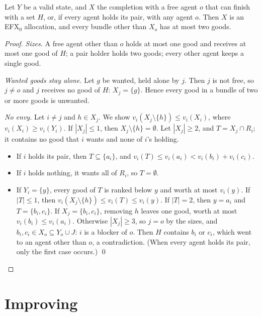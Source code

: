 \documentclass[runningheads,11pt]{llncs}
\newcommand{\efxz}{\texorpdfstring{\mbox{EFX$_0$}}{EFX0}}
\begin{document}
\begin{theorem}[soundness]\label{thm:sound}
Let $Y$ be a valid state, and $X$ the completion with a free agent $o$ that can finish with a set $H$, or, if every agent holds its pair, with any agent $o$. Then $X$ is an \efxz{} allocation, and every bundle other than $X_o$ has at most two goods.
\end{theorem}

\begin{proof}
\emph{Sizes.} A free agent other than $o$ holds at most one good and receives at most one good of $H$; a pair holder holds two goods; every other agent keeps a single good.

\emph{Wanted goods stay alone.} Let $g$ be wanted, held alone by $j$. Then $j$ is not free, so $j\ne o$ and $j$ receives no good of $H$: $X_j=\{g\}$. Hence every good in a bundle of two or more goods is unwanted.

\emph{No envy.} Let $i\ne j$ and $h\in X_j$. We show $v_i(X_j\setminus\{h\})\le v_i(X_i)$, where $v_i(X_i)\ge v_i(Y_i)$. If $|X_j|\le1$, then $X_j\setminus\{h\}=\emptyset$. Let $|X_j|\ge2$, and $T=X_j\cap R_i$; it contains no good that $i$ wants and none of $i$'s holding.
\begin{itemize}
\item If $i$ holds its pair, then $T\subseteq\{a_i\}$, and $v_i(T)\le v_i(a_i)<v_i(b_i)+v_i(c_i)$.
\item If $i$ holds nothing, it wants all of $R_i$, so $T=\emptyset$.
\item If $Y_i=\{y\}$, every good of $T$ is ranked below $y$ and worth at most $v_i(y)$. If $|T|\le1$, then $v_i(X_j\setminus\{h\})\le v_i(T)\le v_i(y)$. If $|T|=2$, then $y=a_i$ and $T=\{b_i,c_i\}$. If $X_j=\{b_i,c_i\}$, removing $h$ leaves one good, worth at most $v_i(b_i)\le v_i(a_i)$. Otherwise $|X_j|\ge3$, so $j=o$ by the sizes, and $b_i,c_i\in X_o\subseteq Y_o\cup J$: $i$ is a blocker of $o$. Then $H$ contains $b_i$ or $c_i$, which went to an agent other than $o$, a contradiction. (When every agent holds its pair, only the first case occurs.) \qed
\end{itemize}
\end{proof}

\section{Improving}\label{sec:improve}
\end{document}
